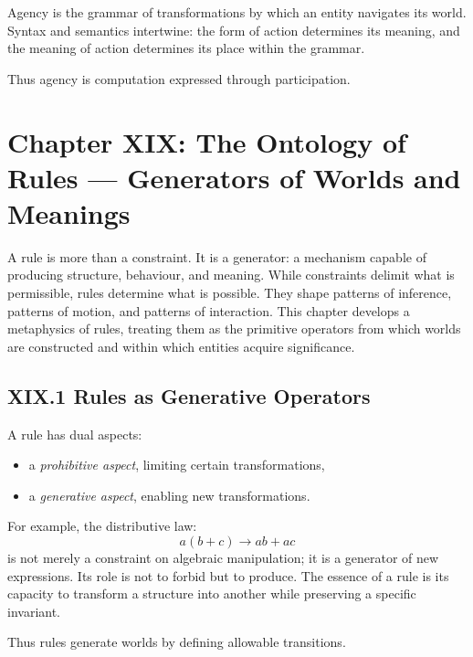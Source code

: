 \documentclass[11pt,letterpaper]{article}
\begin{document}
Agency is the grammar of transformations by which an entity navigates its world. Syntax and semantics intertwine: the form of action determines its meaning, and the meaning of action determines its place within the grammar.

Thus agency is computation expressed through participation.

\newpage
\section{Chapter XIX: The Ontology of Rules — Generators of Worlds and Meanings}

A rule is more than a constraint. It is a generator: a mechanism capable of producing structure, behaviour, and meaning. While constraints delimit what is permissible, rules determine what is possible. They shape patterns of inference, patterns of motion, and patterns of interaction. This chapter develops a metaphysics of rules, treating them as the primitive operators from which worlds are constructed and within which entities acquire significance.

\subsection{XIX.1 Rules as Generative Operators}

A rule has dual aspects:

\begin{itemize}
    \item a \emph{prohibitive aspect}, limiting certain transformations,
    \item a \emph{generative aspect}, enabling new transformations.
\end{itemize}

For example, the distributive law:
\[
a(b + c) \to ab + ac
\]
is not merely a constraint on algebraic manipulation; it is a generator of new expressions. Its role is not to forbid but to produce. The essence of a rule is its capacity to transform a structure into another while preserving a specific invariant.

Thus rules generate worlds by defining allowable transitions.

\end{document}
